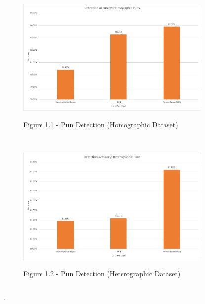 \documentclass[final]{beamer}
\newlength{\onecolwid}
\newlength{\twocolwid}
\begin{document}
\begin{frame}[t]
\begin{columns}[t]
\begin{column}{\twocolwid}
\begin{columns}[t,totalwidth=\twocolwid]
\begin{column}{\onecolwid}
					\begin{figure}
						\includegraphics[width=0.85\textwidth]{HomographicDetection.png}\\
						\caption{Figure 1.1 - Pun Detection (Homographic Dataset)}
					\end{figure}
					\\
					\vspace{20mm}
					\begin{figure}
						\includegraphics[width=0.85\textwidth]{HeterographicDetection.png}\\
						\caption{Figure 1.2 - Pun Detection (Heterographic Dataset)}
					\end{figure}
				\end{column}
			\end{columns}
			\begin{block}
				{.}
			\end{block}
			\begin{columns}[t,totalwidth=\twocolwid]
				\begin{column}{\onecolwid}


\end{column}
\end{columns}
\end{column}
\end{columns}
\end{frame}
\end{document}
